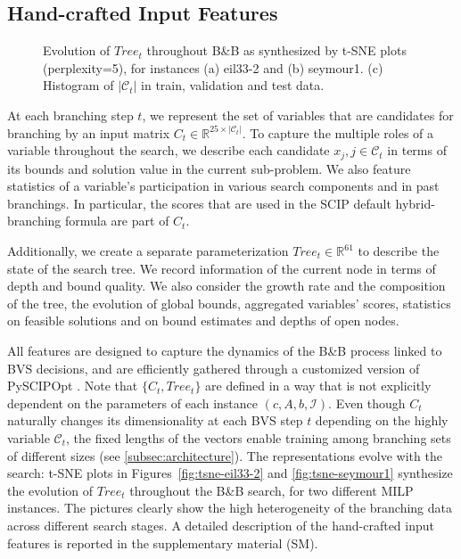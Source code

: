 \documentclass[letterpaper]{article} %
\begin{document}
\subsection{Hand-crafted Input Features}
\label{subsec:features}

\begin{figure*}[!t]
    \centering
    \quad
    \quad
    \caption{Evolution of $\mathit{Tree}_t$ throughout B\&B as synthesized by t-SNE plots (perplexity=5), for instances (a) eil33-2 and (b) seymour1. (c) Histogram of $|\mathcal{C}_t|$ in train, validation and test data.}
    \label{fig:repr-plots}
\end{figure*}

At each branching step $t$, we represent the set of variables that are candidates for branching by an input matrix $C_t\in\mathbb{R}^{25\times |\mathcal{C}_t|}$.
To capture the multiple roles of a variable throughout the search, we describe each candidate $x_j, j\in\mathcal{C}_t$ in terms of its bounds and solution value in the current sub-problem.
We also feature statistics of a variable's participation in various search components and in past branchings.
In particular, the scores that are used in the SCIP default hybrid-branching formula are part of $C_t$.

Additionally, we create a separate parameterization $\mathit{Tree}_t\in\mathbb{R}^{61}$ to describe the state of the search tree.
We record information of the current node in terms of depth and bound quality.
We also consider the growth rate and the composition of the tree, the evolution of global bounds, aggregated variables' scores, statistics on feasible solutions and on bound estimates and depths of open nodes.

All features are designed to capture the dynamics of the B\&B process linked to BVS decisions, and are efficiently gathered through a customized version of PySCIPOpt \cite{pyscipopt}.
Note that $\{C_t, \mathit{Tree}_t\}$ are defined in a way that is not explicitly dependent on the parameters of each instance $(c, A, b, \mathcal{I})$.
Even though $C_t$ naturally changes its dimensionality at each BVS step $t$ depending on the highly variable $\mathcal{C}_t$, the fixed lengths of the vectors enable training among branching sets of different sizes (see \ref{subsec:architecture}).
The representations evolve with the search: t-SNE plots \cite{t-SNE} in Figures~\ref{fig:tsne-eil33-2} and \ref{fig:tsne-seymour1} synthesize the evolution of $\mathit{Tree}_t$ throughout the B\&B search, for two different MILP instances.
The pictures clearly show the high heterogeneity of the branching data across different search stages.
A detailed description of the hand-crafted input features is reported in the supplementary material (SM).
\end{document}
